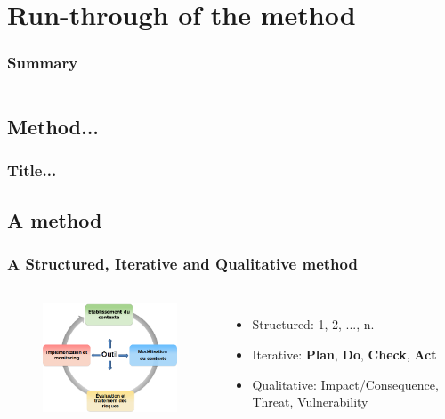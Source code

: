  
%
%
\section{Run-through of the method}
\begin{frame}
    \frametitle{Summary}
    \begin{columns}[t]
        \begin{column}{5cm}
            \tableofcontents[sections={1-3}, currentsection, hideothersubsections]
        \end{column}
        \begin{column}{5cm}
            \tableofcontents[sections={4-5}, currentsection, hideothersubsections]
        \end{column}
    \end{columns}
\end{frame}
\subsection{Method...}
\begin{frame}
    \frametitle{Title...}
    \framesubtitle{}
\end{frame}




\subsection{A method}
\begin{frame}
    \frametitle{A Structured, Iterative and Qualitative method}
    \framesubtitle{}
    \begin{columns}[t]
        \column{6.0cm}
        \begin{figure}
        \includegraphics[width=6.0cm]{./images/MONARC-method-1.png}
        \end{figure}
        \column{6cm}
        \begin{itemize}
                \item Structured: 1, 2, ..., n.
                \item Iterative: \textbf{Plan}, \textbf{Do}, \textbf{Check}, \textbf{Act}
                \item Qualitative: Impact/Consequence, Threat, Vulnerability
        \end{itemize}
        \end{columns}
\end{frame}


